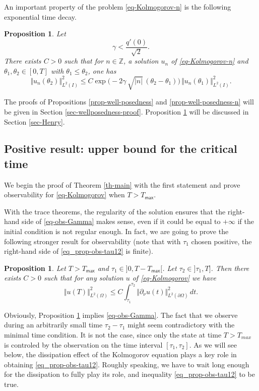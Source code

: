 \documentclass[JEP,XML,SOM,Unicode]{cedram}
\theoremstyle{plain}
\newtheorem{proposition}[theorem]{Proposition}
\theoremstyle{definition}
\newcommand{\abs}[1]{\vert #1\vert}
\newcommand{\nr}[1]{\Vert #1\Vert}
\newcommand{\1}{\mathds 1}
\newcommand{\Z}{\mathbb{Z}}
\let\th\theta
\let\O\Omega
\newcommand{\Tmax}{T_{\mathsf{max}}}
\begin{document}
An important property of the problem \eqref{eq-Kolmogorov-n} is the following exponential time decay.

\begin{proposition} \label{prop-decay-expKn}
Let
\[
\gamma < \frac{q'(0)}{\sqrt{2}}.
\]
There exists $C>0$ such that for $n \in \Z$, a solution $u_n$ of \eqref{eq-Kolmogorov-n} and $\th_1,\th_2 \in [0,T]$ with $\th_1 \leq \th_2$, one has
\[
\nr{u_n(\th_2)}_{L^2(I)}^2 \leq C \exp \bigl(- 2 \gamma\,\sqrt{\abs n}\,(\th_2-\th_1)\bigr)\, \nr{u_n(\th_1)}_{L^2(I)}^2.
\]
\end{proposition}

The proofs of Propositions \ref{prop-well-posedness} and \ref{prop-well-posedness-n} will be given in Section \ref{sec-wellposedness-proof}. Proposition \ref{prop-decay-expKn} will be discussed in Section \ref{sec-Henry}.

\subsection{Positive result: upper bound for the critical time}

We begin the proof of Theorem \ref{th-main} with the first statement and prove observability for \eqref{eq-Kolmogorov} when $T > \Tmax$.

With the trace theorems, the regularity of the solution ensures that the right-hand side of \eqref{eq-obs-Gamma} makes sense, even if it could be equal to $+\infty$ if the initial condition is not regular enough. In fact, we are going to prove the following stronger result for observability (note that with $\tau_1$ chosen positive, the right-hand side of \eqref{eq_prop-obs-tau12} is finite).

\begin{proposition} \label{prop-obs-tau12}
Let $T > \Tmax$ and $\tau_1 \in{}]0,T-\Tmax[$. Let $\tau_2 \in{}]\tau_1,T]$. Then there exists $C > 0$ such that for any solution $u$ of \eqref{eq-Kolmogorov} we have
\begin{equation} \label{eq_prop-obs-tau12}
\nr{u(T)}_{L^2(\O)}^2 \leq C \int_{\tau_1}^{\tau_2} \nr{\partial_\nu u(t)}_{L^2(\partial \O)}^2 \, dt.
\end{equation}
\end{proposition}

Obviously, Proposition \ref{prop-obs-tau12} implies \eqref{eq-obs-Gamma}. The fact that we observe during an arbitrarily small time $\tau_2 - \tau_1$ might seem contradictory with the minimal time condition. It is not the case, since only the state at time $T>T_{max}$ is controled by the observation on the
time interval $[\tau_1,\tau_2]$. As we will see below, the dissipation effect of the Kolmogorov equation plays a key role in obtaining \eqref{eq_prop-obs-tau12}. Roughly speaking, we have to wait long enough for the dissipation to fully play its role, and
inequality \eqref{eq_prop-obs-tau12} to be true.
\end{document}
